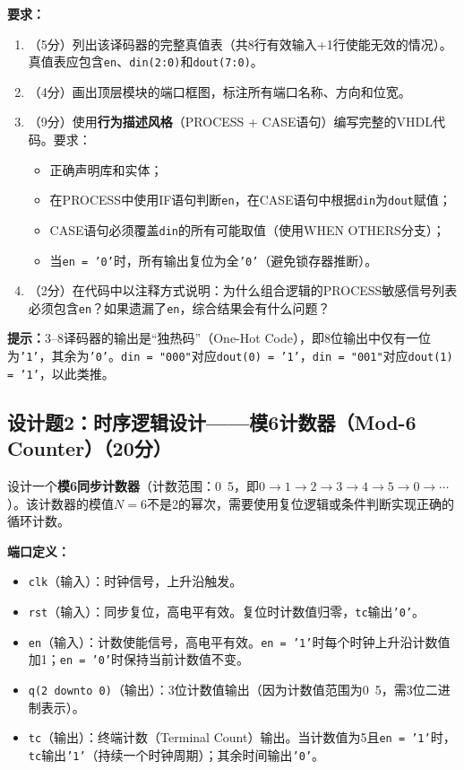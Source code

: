 \textbf{要求：}
\begin{enumerate}[label=(\arabic*)]
  \item （5分）列出该译码器的完整真值表（共8行有效输入+1行使能无效的情况）。真值表应包含\texttt{en}、\texttt{din(2:0)}和\texttt{dout(7:0)}。
  \item （4分）画出顶层模块的端口框图，标注所有端口名称、方向和位宽。
  \item （9分）使用\textbf{行为描述风格}（PROCESS + CASE语句）编写完整的VHDL代码。要求：
  \begin{itemize}
    \item 正确声明库和实体；
    \item 在PROCESS中使用IF语句判断\texttt{en}，在CASE语句中根据\texttt{din}为\texttt{dout}赋值；
    \item CASE语句必须覆盖\texttt{din}的所有可能取值（使用WHEN OTHERS分支）；
    \item 当\texttt{en = '0'}时，所有输出复位为全\texttt{'0'}（避免锁存器推断）。
  \end{itemize}
  \item （2分）在代码中以注释方式说明：为什么组合逻辑的PROCESS敏感信号列表必须包含\texttt{en}？如果遗漏了\texttt{en}，综合结果会有什么问题？
\end{enumerate}

\begin{framed}
\textbf{提示：}3--8译码器的输出是``独热码''（One-Hot Code），即8位输出中仅有一位为\texttt{'1'}，其余为\texttt{'0'}。\texttt{din = "000"}对应\texttt{dout(0) = '1'}，\texttt{din = "001"}对应\texttt{dout(1) = '1'}，以此类推。
\end{framed}

\newpage

\subsection*{设计题2：时序逻辑设计——模6计数器（Mod-6 Counter）（20分）}

设计一个\textbf{模6同步计数器}（计数范围：0~5，即$0 \to 1 \to 2 \to 3 \to 4 \to 5 \to 0 \to \cdots$）。该计数器的模值$N=6$不是2的幂次，需要使用复位逻辑或条件判断实现正确的循环计数。

\textbf{端口定义：}
\begin{itemize}
  \item \texttt{clk}（输入）：时钟信号，上升沿触发。
  \item \texttt{rst}（输入）：同步复位，高电平有效。复位时计数值归零，\texttt{tc}输出\texttt{'0'}。
  \item \texttt{en}（输入）：计数使能信号，高电平有效。\texttt{en = '1'}时每个时钟上升沿计数值加1；\texttt{en = '0'}时保持当前计数值不变。
  \item \texttt{q(2~downto~0)}（输出）：3位计数值输出（因为计数值范围为0~5，需3位二进制表示）。
  \item \texttt{tc}（输出）：终端计数（Terminal Count）输出。当计数值为5且\texttt{en = '1'}时，\texttt{tc}输出\texttt{'1'}（持续一个时钟周期）；其余时间输出\texttt{'0'}。
\end{itemize}

